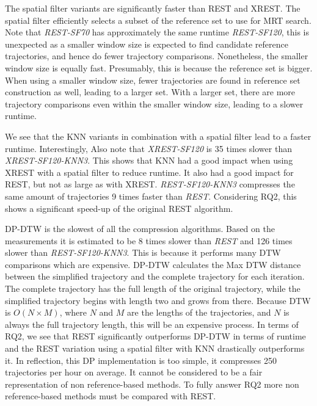 The spatial filter variants are significantly faster than REST and XREST. The spatial filter efficiently selects a subset of the reference set to use for MRT search. Note that \textit{REST-SF70} has approximately the same runtime \textit{REST-SF120}, this is unexpected as a smaller window size is expected to find candidate reference trajectories, and hence do fewer trajectory comparisons. Nonetheless, the smaller window size is equally fast. Presumably, this is because the reference set is bigger. When using a smaller window size, fewer trajectories are found in reference set construction as well, leading to a larger set. With a larger set, there are more trajectory comparisons even within the smaller window size, leading to a slower runtime.

We see that the KNN variants in combination with a spatial filter lead to a faster runtime. Interestingly, Also note that \textit{XREST-SF120} is 35 times slower than \textit{XREST-SF120-KNN3}. This shows that KNN had a good impact when using XREST with a spatial filter to reduce runtime. It also had a good impact for REST, but not as large as with XREST. \textit{REST-SF120-KNN3} compresses the same amount of trajectories 9 times faster than \textit{REST}. Considering RQ2, this shows a significant speed-up of the original REST algorithm.

DP-DTW is the slowest of all the compression algorithms. Based on the measurements it is estimated to be 8 times slower than \textit{REST} and 126 times slower than \textit{REST-SF120-KNN3}. This is because it performs many DTW comparisons which are expensive. DP-DTW calculates the Max DTW distance between the simplified trajectory and the complete trajectory for each iteration. The complete trajectory has the full length of the original trajectory, while the simplified trajectory begins with length two and grows from there. Because DTW is $O(N \times M)$, where $N$ and $M$ are the lengths of the trajectories, and $N$ is always the full trajectory length, this will be an expensive process. In terms of RQ2, we see that REST significantly outperforms DP-DTW in terms of runtime and the REST variation using a spatial filter with KNN drastically outperforms it. In reflection, this DP implementation is too simple, it compresses 250 trajectories per hour on average. It cannot be considered to be a fair representation of non reference-based methods. To fully answer RQ2 more non reference-based methods must be compared with REST.

